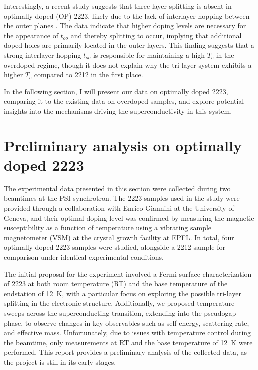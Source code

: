 Interestingly, a recent study suggests that three-layer splitting is absent in optimally doped (OP) 2223, likely due to the lack of interlayer hopping between the outer planes \cite{luo_electronic_2023}.
The data indicate that higher doping levels are necessary for the appearance of $t_{oo}$ and thereby splitting to occur, implying that additional doped holes are primarily located in the outer layers.
This finding suggests that a strong interlayer hopping $t_{oo}$ is responsible for maintaining a high $T_c$ in the overdoped regime, though it does not explain why the tri-layer system exhibits a higher $T_c$ compared to 2212 in the first place.

In the following section, I will present our data on optimally doped 2223, comparing it to the existing data on overdoped samples, and explore potential insights into the mechanisms driving the superconductivity in this system.

\section{Preliminary analysis on optimally doped 2223}

The experimental data presented in this section were collected during two beamtimes at the PSI synchrotron.
The 2223 samples used in the study were provided through a collaboration with Enrico Giannini at the University of Geneva, and their optimal doping level was confirmed by measuring the magnetic susceptibility as a function of temperature using a vibrating sample magnetometer (VSM) at the crystal growth facility at EPFL.
In total, four optimally doped 2223 samples were studied, alongside a 2212 sample for comparison under identical experimental conditions.

The initial proposal for the experiment involved a Fermi surface characterization of 2223 at both room temperature (RT) and the base temperature of the endstation of \qty{12}{\kelvin}, with a particular focus on exploring the possible tri-layer splitting in the electronic structure.
Additionally, we proposed temperature sweeps across the superconducting transition, extending into the pseudogap phase, to observe changes in key observables such as self-energy, scattering rate, and effective mass.
Unfortunately, due to issues with temperature control during the beamtime, only measurements at RT and the base temperature of \qty{12}{\kelvin} were performed.
This report provides a preliminary analysis of the collected data, as the project is still in its early stages.

